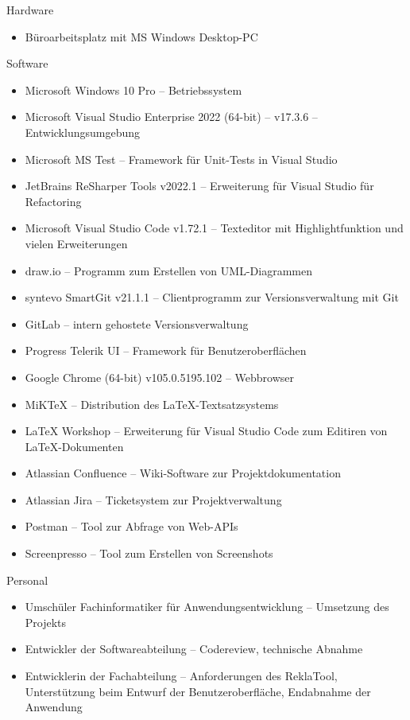 Hardware
\begin{itemize}
    \item Büroarbeitsplatz mit MS Windows Desktop-PC
\end{itemize}
Software
\begin{itemize}
    \item Microsoft Windows 10 Pro -- Betriebssystem
    \item Microsoft Visual Studio Enterprise 2022 (64-bit) -- v17.3.6 -- Entwicklungsumgebung
    \item Microsoft MS Test -- Framework für Unit-Tests in Visual Studio
    \item JetBrains ReSharper Tools v2022.1 -- Erweiterung für Visual Studio für \ua Refactoring
    \item Microsoft Visual Studio Code v1.72.1 -- Texteditor mit Highlightfunktion und vielen Erweiterungen
    \item draw.io -- Programm zum Erstellen von UML-Diagrammen
    \item syntevo SmartGit v21.1.1 -- Clientprogramm zur Versionsverwaltung mit Git
    \item GitLab -- intern gehostete Versionsverwaltung
    \item Progress Telerik UI -- Framework für Benutzeroberflächen
    \item Google Chrome (64-bit) v105.0.5195.102 -- Webbrowser
    \item MiKTeX -- Distribution des LaTeX-Textsatzsystems
    \item LaTeX Workshop -- Erweiterung für Visual Studio Code zum Editiren von LaTeX-Dokumenten
    \item Atlassian Confluence -- Wiki-Software zur Projektdokumentation
    \item Atlassian Jira -- Ticketsystem zur Projektverwaltung
    \item Postman -- Tool zur Abfrage von Web-APIs
    \item Screenpresso -- Tool zum Erstellen von Screenshots
\end{itemize}
Personal
\begin{itemize}
    \item Umschüler Fachinformatiker für Anwendungsentwicklung -- Umsetzung des Projekts
    \item Entwickler der Softwareabteilung  -- Codereview, technische Abnahme
    \item Entwicklerin der Fachabteilung -- Anforderungen des ReklaTool, Unterstützung beim Entwurf der Benutzeroberfläche,
    Endabnahme der Anwendung
\end{itemize}